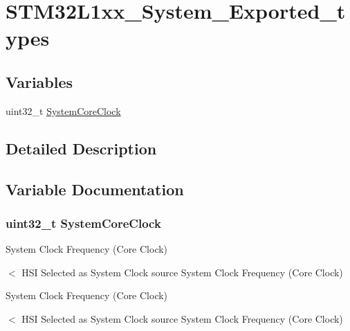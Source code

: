 \hypertarget{group___s_t_m32_l1xx___system___exported__types}{\section{S\-T\-M32\-L1xx\-\_\-\-System\-\_\-\-Exported\-\_\-types}
\label{group___s_t_m32_l1xx___system___exported__types}
}
\subsection*{Variables}
\begin{DoxyCompactItemize}
\item 
uint32\-\_\-t \hyperlink{group___s_t_m32_l1xx___system___exported__types_gaa3cd3e43291e81e795d642b79b6088e6}{System\-Core\-Clock}
\end{DoxyCompactItemize}


\subsection{Detailed Description}


\subsection{Variable Documentation}
\hypertarget{group___s_t_m32_l1xx___system___exported__types_gaa3cd3e43291e81e795d642b79b6088e6}{
\subsubsection[{System\-Core\-Clock}]{\setlength{\rightskip}{0pt plus 5cm}uint32\-\_\-t System\-Core\-Clock}}\label{group___s_t_m32_l1xx___system___exported__types_gaa3cd3e43291e81e795d642b79b6088e6}
System Clock Frequency (Core Clock)

$<$ H\-S\-I Selected as System Clock source System Clock Frequency (Core Clock)

System Clock Frequency (Core Clock)

$<$ H\-S\-I Selected as System Clock source System Clock Frequency (Core Clock) 